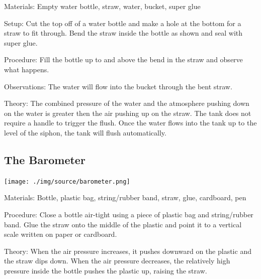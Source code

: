 \begin{multicols}{2}
\begin{description*}
\item[Materials:]{Empty water bottle, straw, water, bucket, super glue}
\item[Setup:]{Cut the top off of a water bottle and make a hole at the bottom for a straw to fit through. Bend the straw inside the bottle as shown and seal with super glue.}
\item[Procedure:]{Fill the bottle up to and above the bend in the straw and observe what happens.}
\item[Observations:]{The water will flow into the bucket through the bent straw.}
\item[Theory:]{The combined pressure of the water and the atmosphere pushing down on the water is greater then the air pushing up on the straw. The tank does not require a handle to trigger the flush. Once the water flows into the tank up to the level of the siphon, the tank will flush automatically. }
\end{description*}

\columnbreak

\subsection{The Barometer}

\begin{center}
\texttt{[image: ./img/source/barometer.png]}
\end{center}

\begin{description*}
\item[Materials:]{Bottle, plastic bag, string/rubber band, straw, glue, cardboard, pen}
\item[Procedure:]{Close a bottle air-tight using a piece of plastic bag and string/rubber band. Glue the straw onto the middle of the plastic and point it to a vertical scale written on paper or cardboard.}
\item[Theory:]{When the air pressure increases, it pushes downward on the plastic and the straw dips down. When the air pressure decreases, the relatively high pressure inside the bottle pushes the plastic up, raising the straw.}
\end{description*}


\end{multicols}
